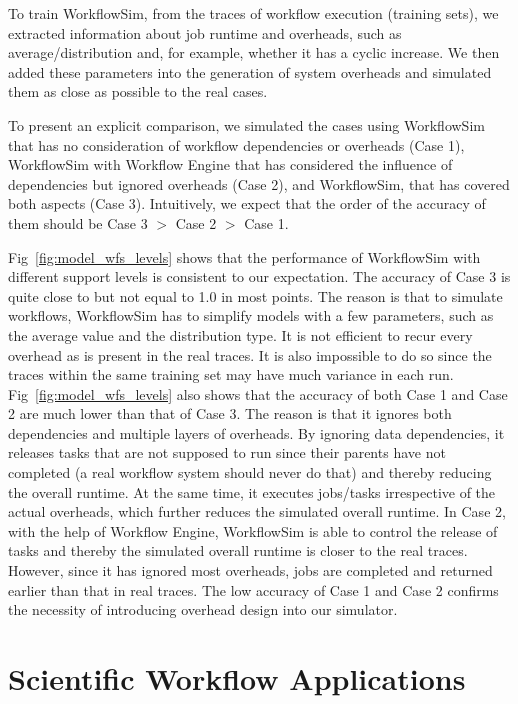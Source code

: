 To train WorkflowSim, from the traces of workflow execution (training sets), we extracted information about job runtime and overheads, such as average/distribution and, for example, whether it has a cyclic increase. We then added these parameters into the generation of system overheads and simulated them as close as possible to the real cases. 

To present an explicit comparison, we simulated the cases using WorkflowSim that has no consideration of workflow dependencies or overheads (Case 1), WorkflowSim with Workflow Engine that has considered the influence of dependencies but ignored overheads (Case 2), and WorkflowSim, that has covered both aspects (Case 3). Intuitively, we expect that the order of the accuracy of them should be Case 3 $>$ Case 2 $>$ Case 1. 

Fig~\ref{fig:model_wfs_levels} shows that the performance of WorkflowSim with different support levels is consistent to our expectation. The accuracy of Case 3 is quite close to but not equal to 1.0 in most points. The reason is that to simulate workflows, WorkflowSim has to simplify models with a few parameters, such as the average value and the distribution type. It is not efficient to recur every overhead as is present in the real traces. It is also impossible to do so since the traces within the same training set may have much variance in each run. Fig~\ref{fig:model_wfs_levels} also shows that the accuracy of both Case 1 and Case 2 are much lower than that of Case 3. The reason is that it ignores both dependencies and multiple layers of overheads. By ignoring data dependencies, it releases tasks that are not supposed to run since their parents have not completed (a real workflow system should never do that) and thereby reducing the overall runtime. At the same time, it executes jobs/tasks irrespective of the actual overheads, which further reduces the simulated overall runtime. In Case 2, with the help of Workflow Engine, WorkflowSim is able to control the release of tasks and thereby the simulated overall runtime is closer to the real traces. However, since it has ignored most overheads, jobs are completed and returned earlier than that in real traces. The low accuracy of Case 1 and Case 2 confirms the necessity of introducing overhead design into our simulator. 

\section{Scientific Workflow Applications}
\label{sec:applications}

